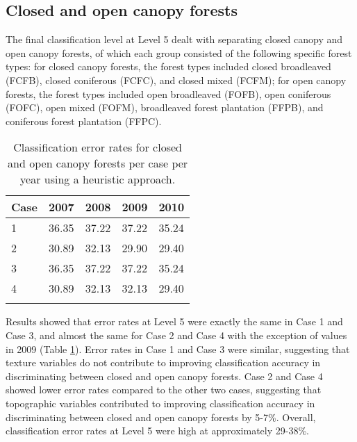 \subsection{Closed and open canopy forests}

The final classification level at Level 5 dealt with separating closed canopy and open canopy forests, of which each group consisted of the following specific forest types: for closed canopy forests, the forest types included closed broadleaved (FCFB), closed coniferous (FCFC), and closed mixed (FCFM); for open canopy forests, the forest types included open broadleaved (FOFB), open coniferous (FOFC), open mixed (FOFM), broadleaved forest plantation (FFPB), and coniferous forest plantation (FFPC).\\

\begin{spacing}{1.0}
\begin{longtable}[h!]{ p{2.6cm} p{2.6cm} p{2.6cm} p{2.6cm} p{2.6cm} }

    \caption[Classification error rates for closed and open canopy forests per case per year using a heuristic approach.]{Classification error rates for closed and open canopy forests per case per year using a heuristic approach.}
    \label{tab: result-table4.5}\\
    
    	\toprule
    	Case & 2007 & 2008 & 2009 & 2010\\
    	\midrule
    	\endhead
    	
		1 & 36.35 & 37.22 & 37.22 & 35.24\\
		2 & 30.89 & 32.13 & 29.90 & 29.40\\
		3 & 36.35 & 37.22 & 37.22 & 35.24\\
		4 & 30.89 & 32.13 & 32.13 & 29.40\\
		
		\bottomrule \\
    
\end{longtable}
\end{spacing}

Results showed that error rates at Level 5 were exactly the same in Case 1 and Case 3, and almost the same for Case 2 and Case 4 with the exception of values in 2009 (Table \ref{tab: result-table4.5}). Error rates in Case 1 and Case 3 were similar, suggesting that texture variables do not contribute to improving classification accuracy in discriminating between closed and open canopy forests. Case 2 and Case 4 showed lower error rates compared to the other two cases, suggesting that topographic variables contributed to improving classification accuracy in discriminating between closed and open canopy forests by 5-7\%. Overall, classification error rates at Level 5 were high at approximately 29-38\%.

